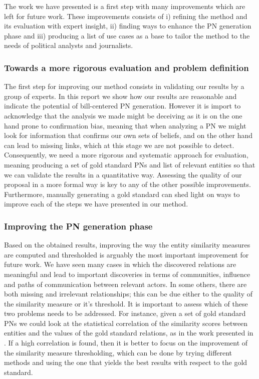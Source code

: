 The work we have presented is a first step with many improvements which are left for future work. These improvements consists of i) refining the method and its evaluation with expert insight, ii) finding ways to enhance the PN generation phase and iii) producing a list of use cases as a base to tailor the method to the needs of political analysts and journalists.\\

\subsubsection{Towards a more rigorous evaluation and problem definition}

The first step for improving our method consists in validating our results by a group of experts. In this report we show how our results are reasonable and indicate the potential of bill-centered PN generation. However it is import to acknowledge that the analysis we made might be deceiving as it is on the one hand prone to confirmation bias, meaning that when analyzing a PN we might look for information that confirms our own sets of beliefs, and on the other hand can lead to missing links, which at this stage we are not possible to detect. \\

Consequently, we need a more rigorous and systematic approach for evaluation, meaning producing a set of gold standard PNs and list of relevant entities so that we can validate the results in a quantitative way. Assessing the quality of our proposal in a more formal way is key to any of the other possible improvements. Furthermore, manually generating a gold standard can shed light on ways to improve each of the steps we have presented in our method. \\

\subsubsection{Improving the PN generation phase}

Based on the obtained results, improving the way the entity similarity measures are computed and thresholded is arguably the most important improvement for future work. We have seen many cases in which the discovered relations are meaningful and lead to important discoveries in terms of communities, influence and paths of communication between relevant actors. In some others, there are both missing and irrelevant relationships; this can be due either to the quality of the similarity measure or it's threshold. It is important to assess which of these two problems needs to be addressed. For instance, given a set of gold standard PNs we could look at the statistical correlation of the similarity scores between entities and the values of the gold standard relations, as in the work presented in \cite{policy-networks}. If a high correlation is found, then it is better to focus on the improvement of the similarity measure thresholding, which can be done by trying different methods and using the one that yields the best results with respect to the gold standard.\\

